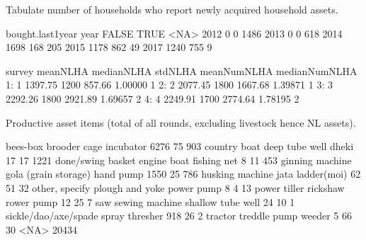 
Tabulate number of households who report newly acquired household assets.
\begin{Schunk}
\begin{Soutput}
      bought.last1year
year   FALSE TRUE <NA>
  2012     0    0 1486
  2013     0    0  618
  2014  1698  168  205
  2015  1178  862   49
  2017  1240  755    9
\end{Soutput}
\begin{Soutput}
   survey meanNLHA medianNLHA stdNLHA meanNumNLHA medianNumNLHA
1:      1  1397.75       1200  857.66     1.00000             1
2:      2  2077.45       1800 1667.68     1.39871             1
3:      3  2292.26       1800 2921.89     1.69657             2
4:      4  2249.91       1700 2774.64     1.78195             2
\end{Soutput}
\end{Schunk}
Productive asset items (total of all rounds, excluding livestock hence NL assets).
\begin{Schunk}
\begin{Soutput}

            bees-box              brooder       cage incubator 
                6276                   75                  903 
        country boat       deep tube well                dheki 
                  17                   17                 1221 
   done/swing basket          engine boat          fishing net 
                   8                   11                  453 
     ginning machine gola (grain storage)            hand pump 
                1550                   25                  786 
     husking machine                 jata          ladder(moi) 
                  62                   51                   32 
      other, specify      plough and yoke           power pump 
                   8                    4                   13 
        power tiller             rickshaw           rower pump 
                  12                   25                    7 
                 saw       sewing machine    shallow tube well 
                  24                   10                    1 
sickle/dao/axe/spade                spray             thresher 
                 918                   26                    2 
             tractor         treddle pump               weeder 
                   5                   66                   30 
                <NA> 
               20434 
\end{Soutput}
\end{Schunk}


